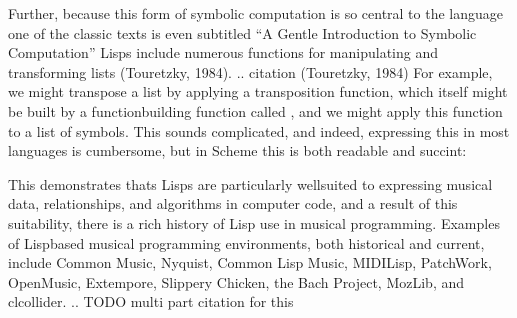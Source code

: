 \documentclass[letterpaper,10pt,english]{sphinxmanual}
\begin{document}
\sphinxAtStartPar
Further, because this form of symbolic computation is so central to the language \sphinxhyphen{} one of the classic texts is even subtitled
“A Gentle Introduction to Symbolic Computation” \sphinxhyphen{} Lisps include numerous functions for manipulating and transforming lists (Touretzky, 1984).
.. citation (Touretzky, 1984)
For example, we might transpose a list by applying a transposition function, which itself might be built by a function\sphinxhyphen{}building function
called , and we might apply this function to a list of symbols.
This sounds complicated, and indeed, expressing this in most languages is cumbersome, but in Scheme this is both readable and succint:

\begin{sphinxVerbatim}[commandchars=\\\{\}]

\end{sphinxVerbatim}

\sphinxAtStartPar
This demonstrates thats Lisps are particularly well\sphinxhyphen{}suited to expressing musical data, relationships, and algorithms in
computer code, and a result of this suitability, there is a rich history of Lisp use in musical programming.
Examples of Lisp\sphinxhyphen{}based musical programming environments, both historical and current, include Common Music,
Nyquist, Common Lisp Music, MIDI\sphinxhyphen{}Lisp, PatchWork, OpenMusic, Extempore, Slippery Chicken, the Bach Project, MozLib,
and cl\sphinxhyphen{}collider.
.. TODO multi part citation for this
\end{document}
